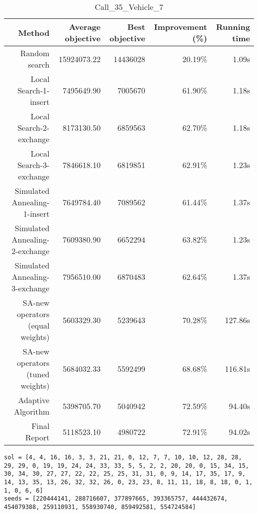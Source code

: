 \begin{table}[ht]
\centering
\caption{Call\_35\_Vehicle\_7}
\label{tab:call35vehicle7}
\begin{tabular}{|r|r|r|r|r|}
Method & Average objective & Best objective & Improvement (\%) & Running time \\
\hline
Random search & 15924073.22 & 14436028 & 20.19\% & 1.09s\\
Local Search-1-insert & 7495649.90 & 7005670 & 61.90\% & 1.18s\\
Local Search-2-exchange & 8173130.50 & 6859563 & 62.70\% & 1.18s\\
Local Search-3-exchange & 7846618.10 & 6819851 & 62.91\% & 1.23s\\
Simulated Annealing-1-insert & 7649784.40 & 7089562 & 61.44\% & 1.37s\\
Simulated Annealing-2-exchange & 7609380.90 & 6652294 & 63.82\% & 1.23s\\
Simulated Annealing-3-exchange & 7956510.00 & 6870483 & 62.64\% & 1.37s\\
SA-new operators (equal weights) & 5603329.30 & 5239643 & 70.28\% & 127.86s\\
SA-new operators (tuned weights) & 5684032.33 & 5592499 & 68.68\% & 116.81s\\
Adaptive Algorithm & 5398705.70 & 5040942 & 72.59\% & 94.40s\\
Final Report & 5118523.10 & 4980722 & 72.91\% & 94.02s\\
\end{tabular}%
\end{table}
\begin{lstlisting}[label={lst:call35vehicle7},caption=Optimal solution call\_35\_vehicle\_7]
sol = [4, 4, 16, 16, 3, 3, 21, 21, 0, 12, 7, 7, 10, 10, 12, 28, 28, 29, 29, 0, 19, 19, 24, 24, 33, 33, 5, 5, 2, 2, 20, 20, 0, 15, 34, 15, 30, 34, 30, 27, 27, 22, 22, 25, 25, 31, 31, 0, 9, 14, 17, 35, 17, 9, 14, 13, 35, 13, 26, 32, 32, 26, 0, 23, 23, 8, 11, 11, 18, 8, 18, 0, 1, 1, 0, 6, 6]
seeds = [220444141, 288716607, 377897665, 393365757, 444432674, 454079388, 259110931, 558930740, 859492581, 554724584]
\end{lstlisting}%
\clearpage


